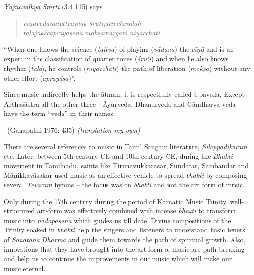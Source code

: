 \vspace{-.2cm}

\textit{Yājñavalkya Smṛti} (3.4.115) says

\begin{verse}
\textit{vīṇāvādanatattvajñaḥ śrutijātiviśāradaḥ} \\ \textit{tālajñaścāprayāsena mokṣamārgaṁ niyacchati} 
\end{verse}

“When one knows the science (\textit{tattva}) of playing (\textit{vādana}) the \textit{vīṇā} and is an expert in the classification of quarter tones (\textit{śruti}) and when he also knows rhythm (\textit{tāla}), he controls (\textit{niyacchati}) the path of liberation (\textit{mokṣa}) without any other effort (\textit{aprayāsa})”.

\begin{myquote}
Since music indirectly helps the ātman, it is respectfully called Upaveda. Except Arthaśāstra all the other three - Āyurveda, Dhanurveda and Gāndharva-veda have the term “veda” in their names. 

~\hfill (Ganapathi 1976: 435) \textit{(translation my own)}
\end{myquote}

There are several references to music in Tamil Sangam literature, \textit{Silappadikāram} etc. Later, between 5th century CE and 10th century CE, during the \textit{Bhakti} movement in Tamilnadu, saints like Tirunāvukkarasar, Sundarar, Sambandar and Māṇikkavāsakar used music as an effective vehicle to spread \textit{bhakti} by composing several \textit{Tevāram} hymns – the focus was on \textit{bhakti} and not the art form of music.

Only during the 17th century during the period of Karnatic Music Trinity, well-structured art-form was effectively combined with intense \textit{bhakti} to transform music into \textit{nādopāsanā} which guides us till date. Divine compositions of the Trinity soaked in \textit{bhakti} help the singers and listeners to understand basic tenets of \textit{Sanātana Dharma} and guide them towards the path of spiritual growth. Also, innovations that they have brought into the art form of music are path-breaking and help us to continue the improvements in our music which will make our music eternal.

